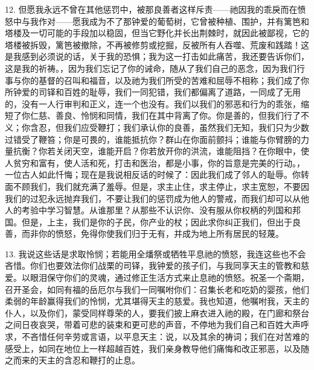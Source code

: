 12. 但愿我永远不曾在其他惩罚中，被那良善者这样斥责——祂因我的乖戾而在愤怒中与我作对——愿我成为不了那钟爱的葡萄树，它曾被种植、围护，并有篱笆和塔楼及一切可能的手段加以稳固，但当它野化并长出荆棘时，就因此被鄙视，它的塔楼被拆毁，篱笆被撤除，不再被修剪或挖掘，反被所有人吞噬、荒废和践踏！这是我感到必须说的话，关于我的恐惧；我为这一打击如此痛苦，我还要告诉你们，这是我的祈祷。，因为我们忘记了你的诫命，随从了我们自己的恶念，因为我们行事与你的基督的召叫和福音，以及祂为我们所受的苦难和屈辱不相称；我们成了你所钟爱的司铎和百姓的耻辱，我们一同犯错，我们都偏离了道路，一同成了无用的，没有一人行审判和正义，连一个也没有。我们以我们的邪恶和行为的乖张，缩短了你仁慈、善良、怜悯和同情，我们在其中背离了你。你是善的，但我们行了不义；你含忍，但我们应受鞭打；我们承认你的良善，虽然我们无知，我们只为少数过错受了鞭笞；你是可畏的，谁能抵抗你？群山在你面前颤抖；谁能与你臂膀的力量抗衡？你若关闭天空，谁能开启？你若放开你的洪流，谁能阻挡？在你眼中，使人贫穷和富有，使人活和死，打击和医治，都是小事，你的旨意是完美的行动。，一位古人如此忏悔；现在是我说相反话的时候了：因此我们成了邻人的耻辱。你转面不顾我们，我们就充满了羞辱。但是，求主止住，求主停止，求主宽恕，不要因我们的过犯永远抛弃我们，不要让我们的惩罚成为他人的警戒，而我们却可以从他人的考验中学习智慧。从谁那里？从那些不认识你、没有服从你权柄的列国和邦国。但是，上主，我们是你的子民，你产业的杖；因此求你纠正我们，但出于良善，而非你的愤怒，免得你使我们归于无有，并成为地上所有居民的轻蔑。\par

13. 我说这些话是求取怜悯；若能用全燔祭或牺牲平息祂的愤怒，我连这些也不会吝惜。你们也要效法你们战栗的司铎，我钟爱的孩子们，与我同享天主的管教和慈爱。以眼泪保守你们的灵魂，通过修正生活方式来止息祂的愤怒。祝圣一个斋期，召开圣会，如同有福的岳厄尔与我们一同嘱咐你们：召集长老和吃奶的婴孩，他们柔弱的年龄赢得我们的怜悯，尤其堪得天主的慈爱。我也知道，他嘱咐我，天主的仆人，以及你们，蒙受同样尊荣的人，要我们披上麻衣进入祂的殿，在门廊和祭台之间日夜哀哭，带着可悲的装束和更可悲的声音，不停地为我们自己和百姓大声呼求，不吝惜任何辛劳或言语，以平息天主：说，以及其余的祷词；我们在对苦难的感受上，如同在地位上一样超越百姓，我们亲身教导他们痛悔和改正邪恶，以及随之而来的天主的含忍和鞭打的止息。\par

